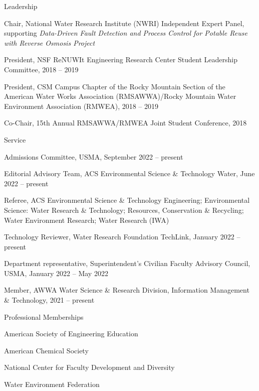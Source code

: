 \documentclass{resume} %
\begin{document}
\begin{rSection}{Leadership}

Chair,  National Water Research Institute (NWRI) Independent Expert Panel, supporting \emph{Data-Driven Fault Detection and Process Control for Potable Reuse with Reverse Osmosis Project}

President, NSF ReNUWIt Engineering Research Center Student Leadership Committee, 2018 – 2019

President, CSM Campus Chapter of the Rocky Mountain Section of the American Water Works Association (RMSAWWA)/Rocky Mountain Water Environment Association (RMWEA), 2018 – 2019

Co-Chair, 15th Annual RMSAWWA/RMWEA Joint Student Conference, 2018

\end{rSection}

\begin{rSection}{Service}

Admissions Committee, USMA, September 2022 – present

Editorial Advisory Team, ACS Environmental Science \& Technology Water, June 2022 – present

Referee, ACS Environmental Science \& Technology Engineering; Environmental Science: Water Research \& Technology; Resources, Conservation \& Recycling; Water Environment Research; Water Research (IWA)

Technology Reviewer, Water Research Foundation TechLink, January 2022 – present

Department representative, Superintendent's Civilian Faculty Advisory Council, USMA, January 2022 – May 2022

Member, AWWA Water Science \& Research Division, Information Management \& Technology, 2021 – present

\end{rSection}

\begin{rSection}{Professional Memberships}

American Society of Engineering Education

American Chemical Society

National Center for Faculty Development and Diversity

Water Environment Federation

\end{rSection}
\end{document}

